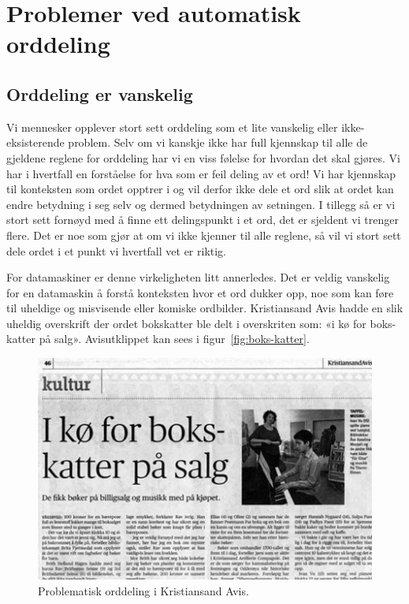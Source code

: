 \section{Problemer ved automatisk orddeling}

\subsection{Orddeling er vanskelig} %

Vi mennesker opplever stort sett orddeling som et lite vanskelig eller ikke-eksisterende problem. Selv om vi kanskje ikke har full kjennskap til alle de gjeldene reglene for orddeling har vi en viss følelse for hvordan det skal gjøres. Vi har i hvertfall en forståelse for hva som er feil deling av et ord! Vi har kjennskap til konteksten som ordet opptrer i og vil derfor ikke dele et ord slik at ordet kan endre betydning i seg selv og dermed betydningen av setningen. I tillegg så er vi stort sett fornøyd med å finne ett delingspunkt i et ord, det er sjeldent vi trenger flere. Det er noe som gjør at om vi ikke kjenner til alle reglene, så vil vi stort sett dele ordet i et punkt vi hvertfall vet er riktig. 

For datamaskiner er denne virkeligheten litt annerledes. Det er veldig vanskelig for en datamaskin å forstå konteksten hvor et ord dukker opp, noe som kan føre til uheldige og misvisende eller komiske ordbilder. Kristiansand Avis hadde en slik uheldig overskrift der ordet bokskatter ble delt i overskriten som: «i kø for boks-katter på salg». Avisutklippet kan sees i figur~\ref{fig:boks-katter}.



\begin{figure}
\includegraphics[width=\textwidth]{content/figures/boks-katter.jpg}
\caption{Problematisk orddeling i Kristiansand Avis.}
\label{fig:boks-aktter}
\end{figure}

